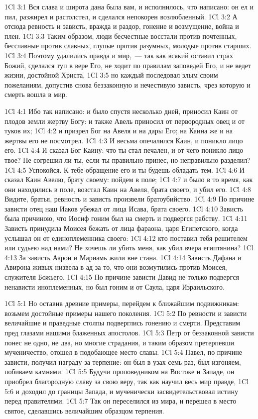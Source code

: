 \vs 1Cl 3:1
Вся слава и широта дана
была вам, и исполнилось, что написано: он ел и пил, разжирел и растолстел, и
сделался непокорен возлюбленный.
\vs 1Cl 3:2
А отсюда ревность и
зависть, вражда и раздор, гонение и возмущение, война и плен.
\vs 1Cl 3:3
Таким образом, люди
бесчестные восстали против почтенных, бесславные против славных, глупые против
разумных, молодые против старших.
\vs 1Cl 3:4
Поэтому удалились правда и
мир,~--- так как всякий оставил страх Божий, сделался туп в вере Его, не ходит
по правилам заповедей Его, и не ведет жизни, достойной Христа,
\vs 1Cl 3:5
но каждый последовал злым
своим пожеланиям, допустив снова беззаконную и нечестивую зависть, чрез
которую и смерть вошла в мир.

\vs 1Cl 4:1
Ибо так написано: и было
спустя несколько дней, приносил Каин от плодов земли жертву Богу: и также
Авель приносил от первородных овец и от туков их;
\vs 1Cl 4:2
и призрел Бог на Авеля и
на дары Его; на Каина же и на жертвы его не посмотрел.
\vs 1Cl 4:3
И весьма опечалился Каин,
и поникло лицо его.
\vs 1Cl 4:4
И сказал Бог Каину: что ты
стал печален, и от чего поникло лицо твое? Не согрешил ли ты, если ты
правильно принес, но неправильно разделил?
\vs 1Cl 4:5
Успокойся. К тебе
обращение его и ты будешь обладать тем.
\vs 1Cl 4:6
И сказал Каин Авелю, брату
своему: пойдем в поле;
\vs 1Cl 4:7
и было в то время, как они
находились в поле, возстал Каин на Авеля, брата своего, и убил его.
\vs 1Cl 4:8
Видите, братья, ревность и
зависть произвели братоубийство.
\vs 1Cl 4:9
По причине зависти отец
наш Иаков убежал от лица Исава, брата своего.
\vs 1Cl 4:10
Зависть была причиною,
что Иосиф гоним был на смерть и подвергся рабству.
\vs 1Cl 4:11
Зависть принудила Моисея
бежать от лица фараона, царя Египетского, когда услышал он от единоплеменника
своего:
\vs 1Cl 4:12
кто поставил тебя
решителем или судьею над нами? Не хочешь ли убить меня, как убил вчера
египтянина?
\vs 1Cl 4:13
За зависть Аарон и
Мариамь жили вне стана.
\vs 1Cl 4:14
Зависть Дафана и Авирона
живых низвела в ад за то, что они возмутились против Моисея, служителя
Божьего.
\vs 1Cl 4:15
По причине зависти Давид
не только подвергся ненависти иноплеменных, но был гоним и от Саула, царя
Израильского.

\vs 1Cl 5:1
Но оставив древние
примеры, перейдем к ближайшим подвижникам: возьмем достойные примеры нашего
поколения.
\vs 1Cl 5:2
По ревности и зависти
величайшие и праведные столпы подверглись гонению и смерти. Представим пред
глазами нашими блаженных апостолов.
\vs 1Cl 5:3
Петр от беззаконной
зависти понес не одно, не два, но многие страдания, и таким образом
претерпевши мученичество, отошел в подобающее место славы.
\vs 1Cl 5:4
Павел, по причине зависти,
получил награду за терпение: он был в узах семь раз, был изгоняем, побиваем
камнями.
\vs 1Cl 5:5
Будучи проповедником на
Востоке и Западе, он приобрел благородную славу за свою веру, так как научил
весь мир правде,
\vs 1Cl 5:6
и доходил до границы
Запада, и мученически засвидетельствовал истину перед правителями.
\vs 1Cl 5:7
Так он переселился из
мира, и перешел в место святое, сделавшись величайшим образцом терпения.

